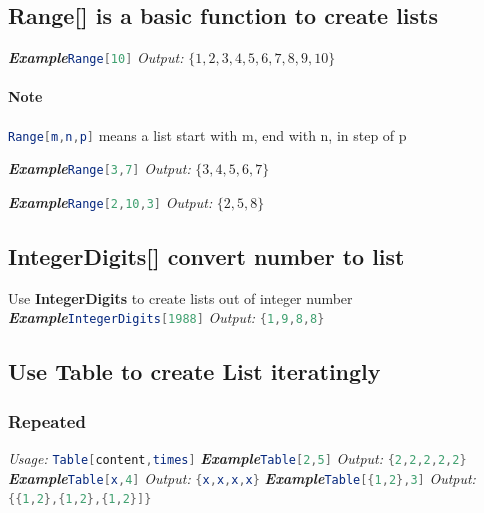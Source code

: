 \documentclass[a4paper]{book}
\begin{document}
\subsection{Range[] is a basic function to create lists}

\noindent\emph{\textbf{Example}}\quad \lstinline[language=Mathematica]|Range[10]| \hspace{\fill}\emph{Output:} $\{1,2,3,4,5,6,7,8,9,10\}$

\paragraph{Note}\lstinline[language=Mathematica]|Range[m,n,p]| means a list start with m, end with n, in step of p

\noindent\emph{\textbf{Example}}\quad \lstinline[language=Mathematica]|Range[3,7]| \hspace{\fill}\emph{Output:} $\{3,4,5,6,7\}$

\noindent\emph{\textbf{Example}}\quad \lstinline[language=Mathematica]|Range[2,10,3]| \hspace{\fill}\emph{Output:} $\{2,5,8\}$

\subsection{IntegerDigits[] convert number to list}
\noindent Use \textbf{IntegerDigits} to create lists out of integer number
\newline
\noindent\emph{\textbf{Example}}\quad \lstinline[language=Mathematica]|IntegerDigits[1988]| \hspace{\fill}\emph{Output:} \lstinline[language=Mathematica]|{1,9,8,8}|

\subsection{Use Table to create List iteratingly}
\label{subsec:label}

\subsubsection{Repeated}
\emph{Usage:} \lstinline[language=Mathematica]|Table[content,times]| 
\newline
\noindent\emph{\textbf{Example}}\quad \lstinline[language=Mathematica]|Table[2,5]| \hspace{\fill}\emph{Output:} \lstinline[language=Mathematica]|{2,2,2,2,2}|
\newline
\noindent\emph{\textbf{Example}}\quad \lstinline[language=Mathematica]|Table[x,4]| \hspace{\fill}\emph{Output:} \lstinline[language=Mathematica]|{x,x,x,x}|
\newline
\noindent\emph{\textbf{Example}}\quad \lstinline[language=Mathematica]|Table[{1,2},3]| \hspace{\fill}\emph{Output:} \lstinline[language=Mathematica]|{{1,2},{1,2},{1,2}]}|
\newline
\end{document}
